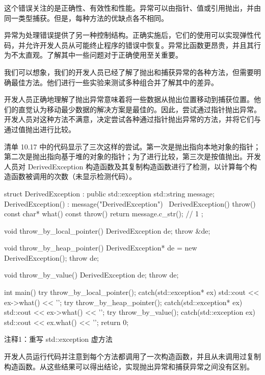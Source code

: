这个错误关注的是正确性、有效性和性能。异常可以由指针、值或引用抛出，并由同一类型捕获。但是，每种方法的优缺点各不相同。

异常为处理错误提供了另一种控制结构。正确实施后，它们的使用可以实现弹性代码，并允许开发人员从可能终止程序的错误中恢复。异常比函数更昂贵，并且其行为不太直观。了解其中一些问题对于正确使用至关重要。


我们可以想象，我们的开发人员已经了解了抛出和捕获异常的各种方法，但需要明确最佳方法。他们进行一些实验来测试多种组合并了解其中的差异。

开发人员正确地理解了抛出异常意味着将一些数据从抛出位置移动到捕获位置。他们的直觉认为移动最少数据的解决方案是最佳的。因此，尝试通过指针抛出异常。开发人员对这种方法不满意，决定尝试各种通过指针抛出异常的方法，并将它们与通过值抛出进行比较。

清单 10.17 中的代码显示了三次这样的尝试。第一次是抛出指向本地对象的指针；第二次是抛出指向基于堆的对象的指针；为了进行比较，第三次是按值抛出。开发人员对 DerivedException 构造函数及其复制构造函数进行了检测，以计算每个构造函数被调用的次数（未显示检测代码）。


\begin{cpp}
struct DerivedException : public std::exception {
  std::string message;
  DerivedException() : message("DerivedException") {}
  ~DerivedException() throw() {}
  const char* what() const throw() { return message.c_str(); } // 1
};

void throw_by_local_pointer() {
  DerivedException de;
  throw &de;
}

void throw_by_heap_pointer() {
  DerivedException* de = new DerivedException();
  throw de;
}

void throw_by_value() {
  DerivedException de;
  throw de;
}

int main() {
  try {
    throw_by_local_pointer();
  } catch(std::exception* ex) {
    std::cout << ex->what() << '\n';
  }
  try {
    throw_by_heap_pointer();
  } catch(std::exception* ex) {
    std::cout << ex->what() << '\n';
  }
  try {
    throw_by_value();
  } catch(std::exception ex) {
    std::cout << ex.what() << '\n';
  }
  return 0;
}
\end{cpp}

{\footnotesize
注释1：重写 std::exception 虚方法
}

开发人员运行代码并注意到每个方法都调用了一次构造函数，并且从未调用过复制构造函数。从这些结果可以得出结论，实现抛出异常和捕获异常之间没有区别。

